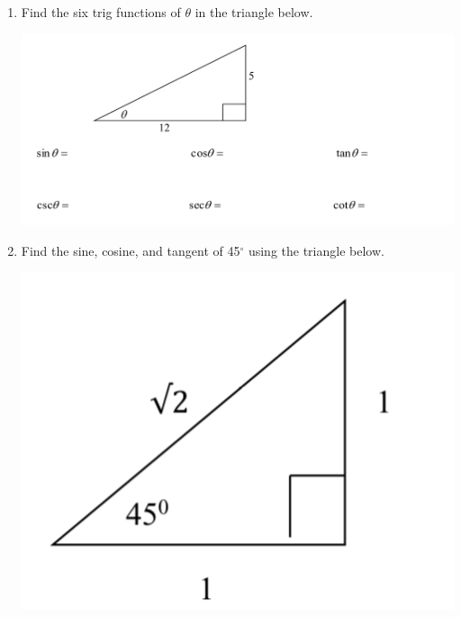 \begin{enumerate}
\item Find the six trig functions of $\theta$ in the triangle below.
\begin{center}
\includegraphics[scale=.6]{trigex1}\\
\end{center}

\item Find the sine, cosine, and tangent of 45$^{\circ}$ using the triangle below.

\includegraphics[scale=.6]{trigex2}\\



\end{enumerate}
